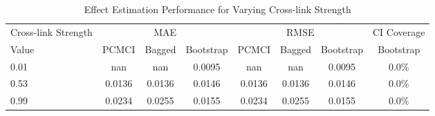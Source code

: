 \begin{table}[htbp]
\centering
\caption{Effect Estimation Performance for Varying Cross-link Strength}
\label{tab:cross_performance}
\begin{tabular}{l|ccc|ccc|c}
\hline
Cross-link Strength & \multicolumn{3}{c|}{MAE} & \multicolumn{3}{c|}{RMSE} & CI Coverage \\
 Value & PCMCI & Bagged & Bootstrap & PCMCI & Bagged & Bootstrap & Bootstrap \\
\hline
0.01 & nan & nan & 0.0095 & nan & nan & 0.0095 & 0.0\% \\
0.53 & 0.0136 & 0.0136 & 0.0146 & 0.0136 & 0.0136 & 0.0146 & 0.0\% \\
0.99 & 0.0234 & 0.0255 & 0.0155 & 0.0234 & 0.0255 & 0.0155 & 0.0\% \\
\hline
\end{tabular}
\end{table}
